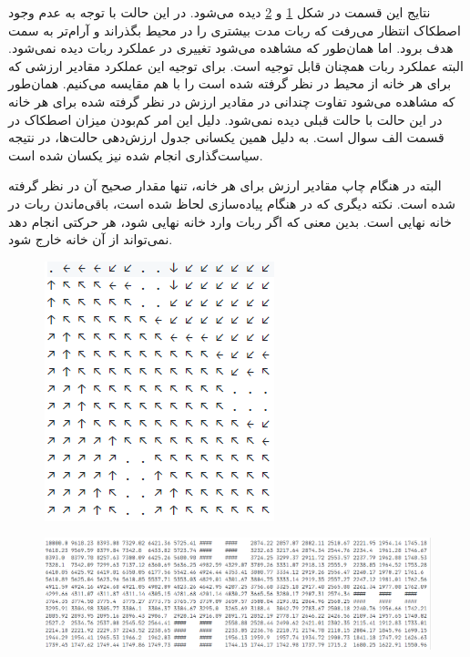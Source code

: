 \documentclass[12pt, a4paper]{article}
\begin{document}
نتایج این قسمت در شکل \ref{partb_policy} و \ref{partb_value} دیده می‌شود.
در این حالت با توجه به عدم وجود اصطکاک انتظار می‌رفت که ربات مدت بیشتری را در
محیط بگذراند و آرام‌تر به سمت هدف برود. اما همان‌طور که مشاهده می‌شود تغییری در
عملکرد ربات دیده نمی‌شود. البته عملکرد ربات همچنان قابل توجیه است. برای توجیه این عملکرد
مقادیر ارزشی که برای هر خانه از محیط در نظر گرفته شده است را با هم مقایسه می‌کنیم.
همان‌طور که مشاهده می‌شود تفاوت چندانی در مقادیر ارزش در نظر گرفته شده برای هر خانه
در این حالت با حالت قبلی دیده نمی‌شود. دلیل این امر کم‌بودن میزان اصطکاک در قسمت الف سوال است.
به دلیل همین یکسانی جدول ارزش‌دهی حالت‌ها، در نتیجه سیاست‌گذاری انجام شده نیز یکسان شده
است.

البته در هنگام چاپ مقادیر ارزش برای هر خانه، تنها مقدار صحیح آن در نظر گرفته شده است.
نکته دیگری که در هنگام پیاده‌سازی لحاظ شده است، باقی‌ماندن ربات در خانه نهایی است. بدین معنی که
اگر ربات وارد خانه نهایی شود، هر حرکتی انجام دهد نمی‌تواند از آن خانه خارج شود.

\begin{figure}[h]
    \centering
    \includegraphics{images/q4/b/policy.png}
    \caption{}
    \label{partb_policy}
\end{figure}

\begin{figure}[h]
    \centering
    \includegraphics[width=0.8\linewidth]{images/q4/b/value.png}
    \caption{}
    \label{partb_value}
\end{figure}
\end{document}

